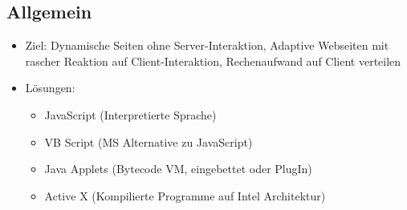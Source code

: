 \documentclass{article} %
\begin{document}
	\subsection{Allgemein}
	\begin{itemize}
		\item Ziel: Dynamische Seiten ohne Server-Interaktion, Adaptive Webseiten mit rascher Reaktion auf Client-Interaktion, Rechenaufwand auf Client verteilen
		\item Lösungen: 
		\begin{itemize}
			\item JavaScript (Interpretierte Sprache)
			\item VB Script (MS Alternative zu JavaScript)
			\item Java Applets (Bytecode VM, eingebettet oder PlugIn)
			\item Active X (Kompilierte Programme auf Intel Architektur)
		\end{itemize}
		

\end{itemize}
\end{document}
